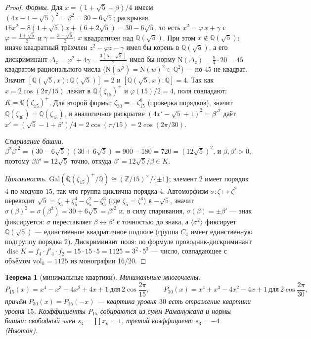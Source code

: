 \documentclass[11pt,a4paper]{article}
\theoremstyle{plain}
\newtheorem{theorem}{Теорема}
\theoremstyle{definition}
\theoremstyle{remark}
\newcommand{\ZZ}{\mathbb{Z}}
\newcommand{\QQ}{\mathbb{Q}}
\newcommand{\disc}{\operatorname{disc}}
\begin{document}
\begin{proof}
\emph{Формы.} Для $x=(1+\sqrt5+\beta)/4$ имеем
$(4x-1-\sqrt5)^2=\beta^2=30-6\sqrt5$; раскрывая,
$16x^2-8(1+\sqrt5)x+(6+2\sqrt5)=30-6\sqrt5$, то есть
$x^2=\varphi\,x+\gamma$ с $\varphi=\frac{1+\sqrt5}{2}$ и
$\gamma=\frac{3-\sqrt5}{2}$: $x$ квадратичен над $\QQ(\sqrt5)$.
При этом $x\notin\QQ(\sqrt5)$: иначе квадратный трёхчлен
$z^2-\varphi z-\gamma$ имел бы корень в $\QQ(\sqrt5)$, а его
дискриминант $\Delta_z=\varphi^2+4\gamma=\frac{3(5-\sqrt5)}{2}$
имел бы норму $\mathrm{N}(\Delta_z)=\frac94\cdot20=45$ квадратом
рационального числа ($\mathrm{N}(w^2)=\mathrm{N}(w)^2\in\QQ^2$) ---
но $45$ не квадрат. Значит
$[\QQ(\sqrt5,x):\QQ(\sqrt5)]=2$ и $[\QQ(\sqrt5,x):\QQ]=4$.
Так как $x=2\cos(2\pi/15)$ лежит в
$\QQ(\zeta_{15})^+$ и $\varphi(15)/2=4$, поля совпадают:
$K=\QQ(\zeta_{15})^+$. Для второй формы: $\zeta_{30}=-\zeta_{15}^8$
(проверка порядков), значит $\QQ(\zeta_{30})=\QQ(\zeta_{15})$,
и аналогичное раскрытие $(4x'-\sqrt5+1)^2=\beta'^2$ даёт
$x'=(\sqrt5-1+\beta')/4=2\cos(\pi/15)=2\cos(2\pi/30)$.

\emph{Спаривание башни.}
$\beta^2\beta'^2=(30-6\sqrt5)(30+6\sqrt5)=900-180=720=(12\sqrt5)^2$,
и $\beta,\beta'>0$, поэтому $\beta\beta'=12\sqrt5$ точно, откуда
$\beta'=12\sqrt5/\beta\in K$.

\emph{Цикличность.} $\mathrm{Gal}(\QQ(\zeta_{15})^+/\QQ)
\cong(\ZZ/15)^\times/\{\pm1\}$; элемент $2$ имеет порядок $4$
по модулю $15$, так что группа циклична порядка $4$.
Автоморфизм $\sigma\colon\zeta\mapsto\zeta^2$ переводит
$\sqrt5=\zeta_5+\zeta_5^4-\zeta_5^2-\zeta_5^3$ (где
$\zeta_5=\zeta^3$) в $-\sqrt5$, значит
$\sigma(\beta)^2=\sigma(\beta^2)=30+6\sqrt5=\beta'^2$ и,
в силу спаривания, $\sigma(\beta)=\pm\beta'$ --- знак
фиксируется: $\sigma$ переставляет $\beta\leftrightarrow\beta'$
с точностью до знака, а $\langle\sigma^2\rangle$ фиксирует
$\QQ(\sqrt5)$ --- единственное квадратичное подполе (группа
$C_4$ имеет единственную подгруппу порядка $2$).
Дискриминант поля: по формуле проводник-дискриминант
$\disc K=f_4\cdot f'_4\cdot f_2=15\cdot15\cdot5=1125=3^2\cdot5^3$
--- число, совпадающее с объёмом $\mathrm{vol}_h=1125$ из
монографии 16/20.
\end{proof}

\begin{theorem}[минимальные квартики]\label{th:quart}
Минимальные многочлены:
\[
  P_{15}(x)=x^4-x^3-4x^2+4x+1 \ \text{для}\ 2\cos\frac{2\pi}{15},
  \qquad
  P_{30}(x)=x^4+x^3-4x^2-4x+1 \ \text{для}\ 2\cos\frac{2\pi}{30},
\]
причём $P_{30}(x)=P_{15}(-x)$ --- квартика уровня $30$ есть
отражение квартики уровня $15$. Коэффициенты $P_{15}$ собираются
из сумм Раманужана и нормы башни: свободный член
$s_4=\prod x_k=1$, третий коэффициент $s_3=-4$ (Ньютон).
\end{theorem}
\end{document}
